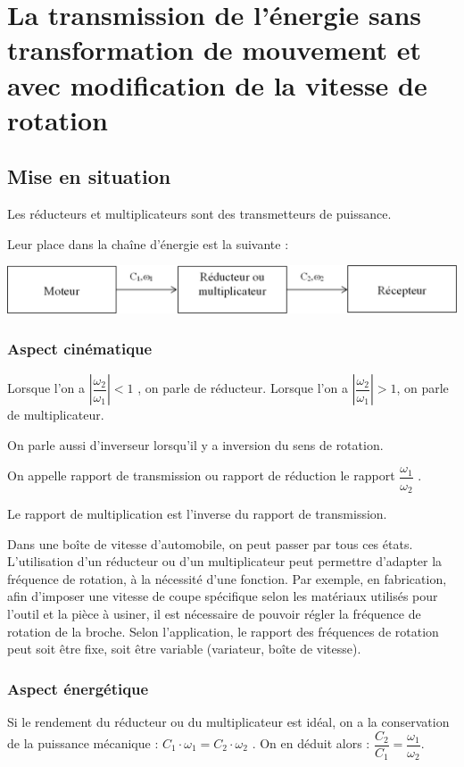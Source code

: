 \documentclass[11pt,oneside]{article}
\begin{document}
\section{La transmission de l’énergie sans transformation de mouvement et avec modification de la vitesse de rotation}
\subsection{Mise en situation}

Les réducteurs et multiplicateurs sont des transmetteurs de puissance.

Leur place dans la chaîne d’énergie est la suivante :
\begin{center}
\includegraphics[width=.8\textwidth]{png/fig_40}
\end{center}

\subsubsection{Aspect cinématique}
Lorsque l’on a $\left|\dfrac{\omega_2}{\omega_1} \right|<1$ , on parle de réducteur. Lorsque l’on a $\left|\dfrac{\omega_2}{\omega_1} \right|>1$, on parle de multiplicateur.

On parle aussi d’inverseur lorsqu’il y a inversion du sens de rotation.

On appelle rapport de transmission ou rapport de réduction le rapport $\dfrac{\omega_1}{\omega_2}$ .

Le rapport de multiplication est l’inverse du rapport de transmission.

Dans une boîte de vitesse d’automobile, on peut passer par tous ces états. L’utilisation d’un réducteur ou d’un multiplicateur peut permettre d’adapter la fréquence de rotation, à la nécessité d’une fonction. Par exemple, en fabrication, afin d’imposer une vitesse de coupe spécifique selon les matériaux utilisés pour l’outil et la pièce à usiner, il est nécessaire de pouvoir régler la fréquence de rotation de la broche. Selon l’application, le rapport des fréquences de rotation peut soit être fixe, soit être variable (variateur, boîte de vitesse).


\subsubsection{Aspect énergétique}
Si le rendement du réducteur ou du multiplicateur est idéal, on a la conservation de la puissance mécanique : $C_1 \cdot \omega_1 = C_2 \cdot \omega_2$ . On en déduit alors : $\dfrac{C_2}{C_1}=\dfrac{\omega_1}{\omega_2}$.
\end{document}
